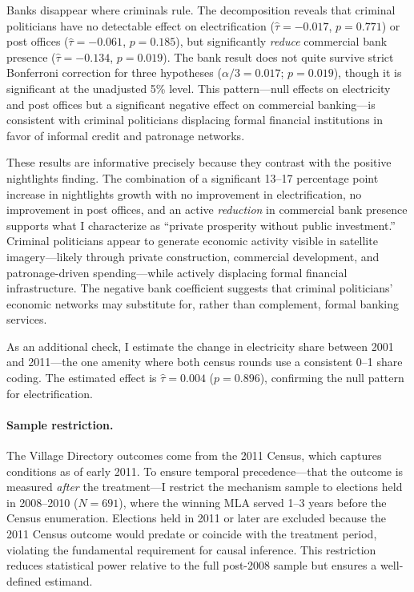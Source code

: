 \documentclass[12pt]{article}
\begin{document}
Banks disappear where criminals rule. The decomposition reveals that criminal politicians have no detectable effect on electrification ($\hat{\tau} = -0.017$, $p = 0.771$) or post offices ($\hat{\tau} = -0.061$, $p = 0.185$), but significantly \textit{reduce} commercial bank presence ($\hat{\tau} = -0.134$, $p = 0.019$). The bank result does not quite survive strict Bonferroni correction for three hypotheses ($\alpha/3 = 0.017$; $p = 0.019$), though it is significant at the unadjusted 5\% level. This pattern---null effects on electricity and post offices but a significant negative effect on commercial banking---is consistent with criminal politicians displacing formal financial institutions in favor of informal credit and patronage networks.

These results are informative precisely because they contrast with the positive nightlights finding. The combination of a significant 13--17 percentage point increase in nightlights growth with no improvement in electrification, no improvement in post offices, and an active \textit{reduction} in commercial bank presence supports what I characterize as ``private prosperity without public investment.'' Criminal politicians appear to generate economic activity visible in satellite imagery---likely through private construction, commercial development, and patronage-driven spending---while actively displacing formal financial infrastructure. The negative bank coefficient suggests that criminal politicians' economic networks may substitute for, rather than complement, formal banking services.

As an additional check, I estimate the change in electricity share between 2001 and 2011---the one amenity where both census rounds use a consistent 0--1 share coding. The estimated effect is $\hat{\tau} = 0.004$ ($p = 0.896$), confirming the null pattern for electrification.

\paragraph{Sample restriction.} The Village Directory outcomes come from the 2011 Census, which captures conditions as of early 2011. To ensure temporal precedence---that the outcome is measured \textit{after} the treatment---I restrict the mechanism sample to elections held in 2008--2010 ($N = 691$), where the winning MLA served 1--3 years before the Census enumeration. Elections held in 2011 or later are excluded because the 2011 Census outcome would predate or coincide with the treatment period, violating the fundamental requirement for causal inference. This restriction reduces statistical power relative to the full post-2008 sample but ensures a well-defined estimand.
\end{document}

